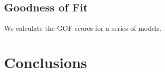 \subsection{Goodness of Fit}
We calculate the GOF scores for a series of models.

\section{Conclusions}




